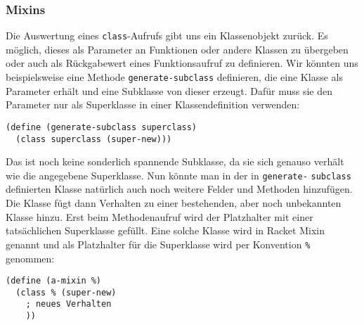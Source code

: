 

\subsubsection{Mixins}
Die Auswertung eines \texttt{class}-Aufrufs gibt uns ein Klassenobjekt zurück. Es möglich, dieses als Parameter an Funktionen oder andere Klassen zu übergeben oder auch als Rückgabewert eines Funktionsaufruf zu definieren. Wir könnten uns beispielsweise eine Methode \texttt{generate-subclass} definieren, die eine Klasse als Parameter erhält und eine Subklasse von dieser erzeugt. Dafür muss sie den Parameter nur als Superklasse in einer Klassendefinition verwenden:

\begin{lstlisting}
(define (generate-subclass superclass)
  (class superclass (super-new)))
\end{lstlisting} 

Das ist noch keine sonderlich spannende Subklasse, da sie sich genauso verhält wie die angegebene Superklasse.
% 
% 
% 
% 
% 
Nun könnte man in der in \texttt{generate-} \texttt{subclass} definierten Klasse natürlich auch noch weitere Felder und Methoden hinzufügen. Die Klasse fügt dann Verhalten zu einer bestehenden, aber noch unbekannten Klasse hinzu. Erst beim Methodenaufruf wird der Platzhalter mit einer tatsächlichen Superklasse gefüllt. Eine solche Klasse wird in Racket Mixin genannt und als Platzhalter für die Superklasse wird per Konvention \texttt{\%} genommen:

\begin{lstlisting}
(define (a-mixin %)
  (class % (super-new)
    ; neues Verhalten
    ))
\end{lstlisting}

